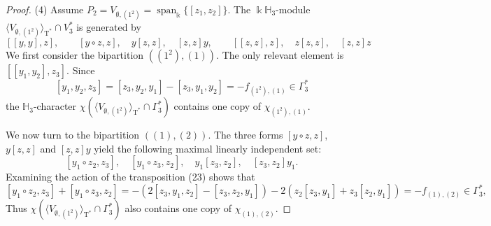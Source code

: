 \documentclass[10pt,a4paper]{amsart}
\def \Ga{\Gamma}
\def \H{\mathbb{H}}
\def \T{\operatorname{T}}
\def \es{\emptyset}
\def \k{\Bbbk}
\newcommand{\lr}[1]{\langle #1 \rangle}
\def \sp{\operatorname{span}}
\begin{document}
\begin{proof}
	(4) Assume $P_2 = V_{\es, (1^2)} = \sp_\k \{ [z_1,z_2] \}$. The $\k\H_3$-module $\lr{V_{\es, (1^2)}}_{\T^*} \cap V_3^*$ is generated by
	\[
	[[y,y],z],\qquad [y\circ z,z],\quad y[z,z],\quad [z,z]y,\qquad [[z,z],z],\quad z[z,z],\quad [z,z]z
	\]
	We first consider the bipartition $((1^2), (1))$. The only relevant element is $[[y_1,y_2],z_3]$. Since
	\[
	[y_1,y_2,z_3]=[z_3,y_2,y_1]-[z_3,y_1,y_2] = -f_{(1^2),(1)} \in \Ga_3^*
	\]
	the $\H_3$-character $\chi(\lr{V_{\es, (1^2)}}_{\T^*} \cap \Ga_3^*)$ contains one copy of $\chi_{(1^2),(1)}$.
	
	We now turn to the bipartition $((1), (2))$. The three forms $[y\circ z,z]$, $y[z,z]$ and $[z,z]y$ yield the following maximal linearly independent set:
	\[
	[y_1\circ z_2,z_3], \quad [y_1\circ z_3,z_2], \quad y_1[z_3,z_2], \quad [z_3,z_2]y_1.
	\]
	Examining the action of the transposition (23) shows that
	\[
	[y_1\circ z_2,z_3]+[y_1\circ z_3,z_2]=-(2[z_3,y_1,z_2]-[z_3,z_2,y_1])-2(z_2[z_3,y_1]+z_3[z_2,y_1]) = -f_{(1),(2)} \in \Ga_3^*,
	\]
	Thus $\chi(\lr{V_{\es, (1^2)}}_{\T^*} \cap \Ga_3^*)$ also  contains one copy of $\chi_{(1),(2)}$.
\end{proof}	
\end{document}
